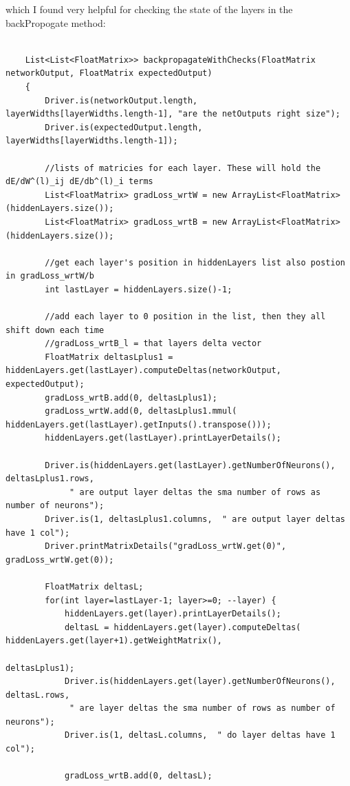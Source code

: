 \documentclass[11pt]{article} %
\begin{document}
which I found very helpful for checking the state of the layers in the backPropogate method:
\begin{lstlisting}
    
    List<List<FloatMatrix>> backpropagateWithChecks(FloatMatrix networkOutput, FloatMatrix expectedOutput)
    {
        Driver.is(networkOutput.length, layerWidths[layerWidths.length-1], "are the netOutputs right size");
        Driver.is(expectedOutput.length, layerWidths[layerWidths.length-1]);

        //lists of matricies for each layer. These will hold the dE/dW^(l)_ij dE/db^(l)_i terms
        List<FloatMatrix> gradLoss_wrtW = new ArrayList<FloatMatrix>(hiddenLayers.size());
        List<FloatMatrix> gradLoss_wrtB = new ArrayList<FloatMatrix>(hiddenLayers.size());
        
        //get each layer's position in hiddenLayers list also postion in gradLoss_wrtW/b
        int lastLayer = hiddenLayers.size()-1;
        
        //add each layer to 0 position in the list, then they all shift down each time
        //gradLoss_wrtB_l = that layers delta vector
        FloatMatrix deltasLplus1 = hiddenLayers.get(lastLayer).computeDeltas(networkOutput, expectedOutput);
        gradLoss_wrtB.add(0, deltasLplus1);
        gradLoss_wrtW.add(0, deltasLplus1.mmul( hiddenLayers.get(lastLayer).getInputs().transpose()));
        hiddenLayers.get(lastLayer).printLayerDetails();

        Driver.is(hiddenLayers.get(lastLayer).getNumberOfNeurons(), deltasLplus1.rows,
             " are output layer deltas the sma number of rows as number of neurons");
        Driver.is(1, deltasLplus1.columns,  " are output layer deltas have 1 col");
        Driver.printMatrixDetails("gradLoss_wrtW.get(0)", gradLoss_wrtW.get(0));
        
        FloatMatrix deltasL;
        for(int layer=lastLayer-1; layer>=0; --layer) {
            hiddenLayers.get(layer).printLayerDetails();
            deltasL = hiddenLayers.get(layer).computeDeltas( hiddenLayers.get(layer+1).getWeightMatrix(),
                                                             deltasLplus1);
            Driver.is(hiddenLayers.get(layer).getNumberOfNeurons(), deltasL.rows,
             " are layer deltas the sma number of rows as number of neurons");
            Driver.is(1, deltasL.columns,  " do layer deltas have 1 col");
            
            gradLoss_wrtB.add(0, deltasL);
            

\end{lstlisting}
\end{document}
